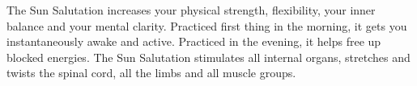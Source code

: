 \documentclass[../Book.Stress_regulation.tex]{subfiles}
\begin{document}


The Sun Salutation increases your physical strength, flexibility, your inner balance and your mental clarity.
Practiced first thing in the morning, it gets you instantaneously awake and active.
Practiced in the evening, it helps free up blocked energies.
The Sun Salutation stimulates all internal organs, stretches and twists the spinal cord, all the limbs and all muscle groups.
\end{document}
